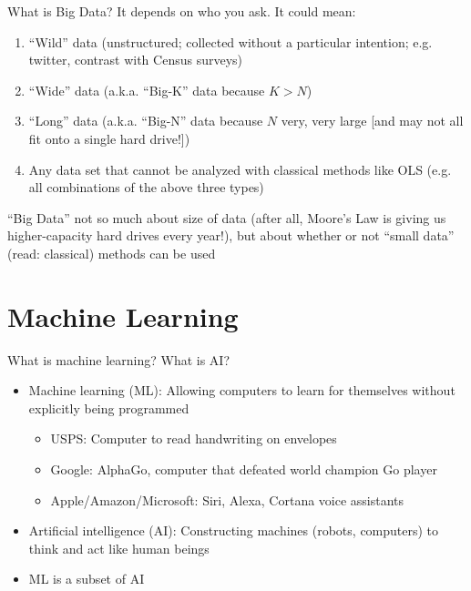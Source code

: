 \documentclass[english,aspectratio=169,12pt,xcolor=dvipsnames]{beamer}
\begin{document}
\begin{frame}{What is Big Data?}
It depends on who you ask. It could mean:
\begin{enumerate}
\item ``Wild'' data (unstructured; collected without a particular intention; e.g. twitter, contrast with Census surveys)
\item ``Wide'' data (a.k.a. ``Big-K'' data because $K>N$)
\item ``Long'' data (a.k.a. ``Big-N'' data because $N$ very, very large [and may not all fit onto a single hard drive!])
\item Any data set that cannot be analyzed with classical methods like OLS (e.g. all combinations of the above three types)
\end{enumerate}
``Big Data'' not so much about size of data (after all, Moore's Law is giving us higher-capacity hard drives every year!), but about whether or not ``small data'' (read: classical) methods can be used
\end{frame}

\section{Machine Learning}
\begin{frame}{What is machine learning? What is AI?}
\begin{itemize}
\item \alert{Machine learning (ML):} Allowing computers to learn for themselves without explicitly being programmed
    \begin{itemize}
    \item \alert{USPS:} Computer to read handwriting on envelopes
    \item \alert{Google:} AlphaGo, computer that defeated world champion Go player
    \item \alert{Apple/Amazon/Microsoft:} Siri, Alexa, Cortana voice assistants 
    \end{itemize}
\item \alert{Artificial intelligence (AI):} Constructing machines (robots, computers) to think and act like human beings
\item ML is a subset of AI
\end{itemize}
\end{frame}
\end{document}
